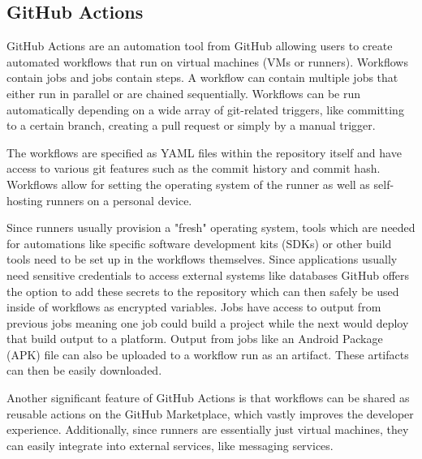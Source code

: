 \subsection{GitHub Actions}
GitHub Actions are an automation tool from GitHub \cite{b3} allowing users to create automated workflows that run on virtual machines (VMs or runners). Workflows contain jobs and jobs contain steps. A workflow can contain multiple jobs that either run in parallel or are chained sequentially. Workflows can be run automatically depending on a wide array of git-related triggers, like committing to a certain branch, creating a pull request or simply by a manual trigger.

The workflows are specified as YAML files within the repository itself and have access to various git features such as the commit history and commit hash. Workflows allow for setting the operating system of the runner as well as self-hosting runners on a personal device.

Since runners usually provision a "fresh" operating system, tools which are needed for automations like specific software development kits (SDKs) or other build tools need to be set up in the workflows themselves. Since applications usually need sensitive credentials to access external systems like databases GitHub offers the option to add these secrets to the repository which can then safely be used inside of workflows as encrypted variables. Jobs have access to output from previous jobs meaning one job could build a project while the next would deploy that build output to a platform. Output from jobs like an Android Package (APK) file can also be uploaded to a workflow run as an artifact. These artifacts can then be easily downloaded.

Another significant feature of GitHub Actions is that workflows can be shared as reusable actions on the GitHub Marketplace, which vastly improves the developer experience. Additionally, since runners are essentially just virtual machines, they can easily integrate into external services, like messaging services.
